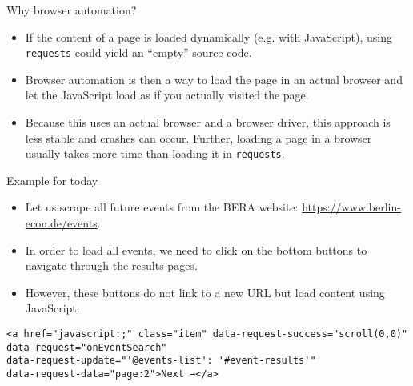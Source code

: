 \begin{frame}[fragile]{Why browser automation?}
\begin{itemize}
	\item If the content of a page is loaded dynamically (e.g. with JavaScript), using \texttt{requests} could yield an ``empty'' source code.
	\item Browser automation is then a way to load the page in an actual browser and let the JavaScript load as if you actually visited the page.
	\item Because this uses an actual browser and a browser driver, this approach is less stable and crashes can occur. Further, loading a page in a browser usually takes more time than loading it in \texttt{requests}.
\end{itemize}
\end{frame}

\begin{frame}[fragile]{Example for today}
\begin{itemize}
	\item Let us scrape all future events from the BERA website: \url{https://www.berlin-econ.de/events}.
	\item In order to load all events, we need to click on the bottom buttons to navigate through the results pages.
	\item However, these buttons do not link to a new URL but load content using JavaScript:
\end{itemize}
\begin{verbatim}
<a href="javascript:;" class="item" data-request-success="scroll(0,0)" 
data-request="onEventSearch" 
data-request-update="'@events-list': '#event-results'" 
data-request-data="page:2">Next →</a>
\end{verbatim}
\end{frame}

